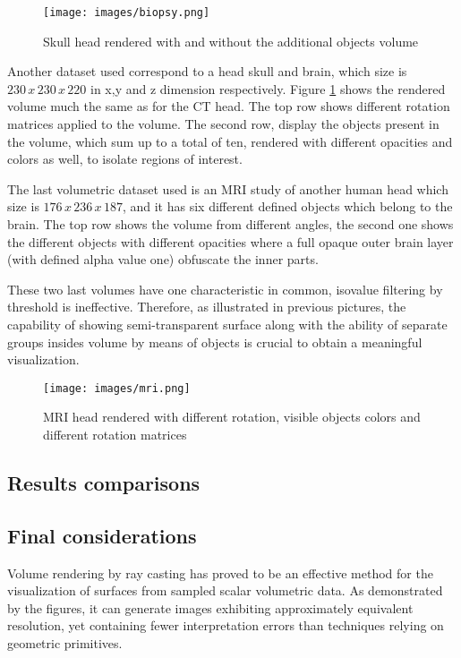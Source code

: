 \documentclass[12pt,a4paper]{extarticle}
\newcommand{\linespace}{\vspace{8pt}}
\begin{document}
\begin{figure}[hbtp]
\centering
\texttt{[image: images/biopsy.png]}
\caption{Skull head rendered with and without the additional objects volume}
\label{fig:biopsy}
\end{figure}


Another dataset used correspond to a head skull and brain, which size is $230\,x\,230\,x\,220$ in x,y and z dimension respectively.
Figure \ref{fig:biopsy} shows the rendered volume much the same as for the CT head. The top row shows different rotation matrices applied to the volume. The second row, display the objects present in the volume, which sum up to a total of ten, rendered with different opacities and colors as well, to isolate regions of interest.
\linespace

The last volumetric dataset used is an MRI study of another human head which size is $176\,x\,236\,x\,187$, and it has six different defined objects which belong to the brain. The top row shows the volume from different angles, the second one shows the different objects with different opacities where a full opaque outer brain layer (with defined alpha value one) obfuscate the inner parts.
\linespace 

These two last volumes have one characteristic in common, isovalue filtering by threshold is ineffective. Therefore, as illustrated in previous pictures, the capability of showing semi-transparent surface along with the ability of separate groups insides volume by means of objects is crucial to obtain a meaningful visualization.

\begin{figure}[hbtp]
\centering
\texttt{[image: images/mri.png]}
\caption{MRI head rendered with different rotation, visible objects colors and different rotation matrices }
\label{fig:mri}
\end{figure}
\vspace{\fill}


\subsection{Results comparisons} 
\subsection{Final considerations} 
Volume rendering by ray casting has proved to be an effective method for the visualization of surfaces from sampled scalar volumetric data. As demonstrated by the figures, it can generate images exhibiting approximately equivalent resolution, yet containing fewer interpretation errors than techniques relying on geometric primitives.
\linespace
\end{document}
